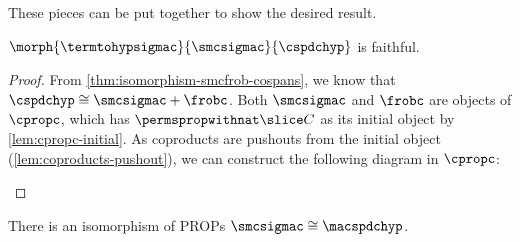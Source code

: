 These pieces can be put together to show the desired result.

\begin{proposition}
    \(\morph{\termtohypsigmac}{\smcsigmac}{\cspdchyp}\) is faithful.
\end{proposition}
\begin{proof}
    From \cref{thm:isomorphism-smcfrob-cospans}, we know that
    \(\cspdchyp \cong \smcsigmac + \frobc\).
    Both \(\smcsigmac\) and \(\frobc\) are objects of \(\cpropc\), which has
    \(\permspropwithnat \slice C\) as its initial object by
    \cref{lem:cpropc-initial}.
    As coproducts are pushouts from the initial object
    (\cref{lem:coproducts-pushout}), we can construct the following diagram in
    \(\cpropc\):
    \begin{center}
        
    \end{center}
\end{proof}

\begin{corollary}
    There is an isomorphism of PROPs \(\smcsigmac \cong \macspdchyp\).
\end{corollary}